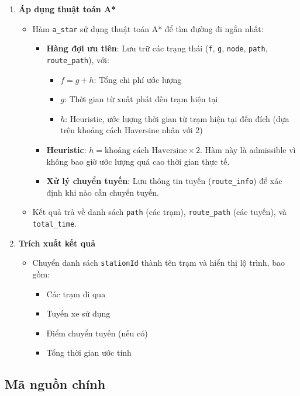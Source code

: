 \documentclass[a4paper,12pt]{article}
\begin{document}
\begin{enumerate}
    \item \textbf{Áp dụng thuật toán A*}
    \begin{itemize}
        \item Hàm \texttt{a\_star} sử dụng thuật toán A* để tìm đường đi ngắn nhất:
        \begin{itemize}
            \item \textbf{Hàng đợi ưu tiên}: Lưu trữ các trạng thái (\texttt{f}, \texttt{g}, \texttt{node}, \texttt{path}, \texttt{route\_path}), với:
            \begin{itemize}
                \item $f = g + h$: Tổng chi phí ước lượng
                \item $g$: Thời gian từ xuất phát đến trạm hiện tại
                \item $h$: Heuristic, ước lượng thời gian từ trạm hiện tại đến đích (dựa trên khoảng cách Haversine nhân với 2)
            \end{itemize}
            \item \textbf{Heuristic}: $h = \text{khoảng cách Haversine} \times 2$. Hàm này là admissible vì không bao giờ ước lượng quá cao thời gian thực tế.
            \item \textbf{Xử lý chuyển tuyến}: Lưu thông tin tuyến (\texttt{route\_info}) để xác định khi nào cần chuyển tuyến.
        \end{itemize}
        \item Kết quả trả về danh sách \texttt{path} (các trạm), \texttt{route\_path} (các tuyến), và \texttt{total\_time}.
    \end{itemize}
    
    \item \textbf{Trích xuất kết quả}
    \begin{itemize}
        \item Chuyển danh sách \texttt{stationId} thành tên trạm và hiển thị lộ trình, bao gồm:
        \begin{itemize}
            \item Các trạm đi qua
            \item Tuyến xe sử dụng
            \item Điểm chuyển tuyến (nếu có)
            \item Tổng thời gian ước tính
        \end{itemize}
    \end{itemize}
\end{enumerate}

\subsection{Mã nguồn chính}
\end{document}
